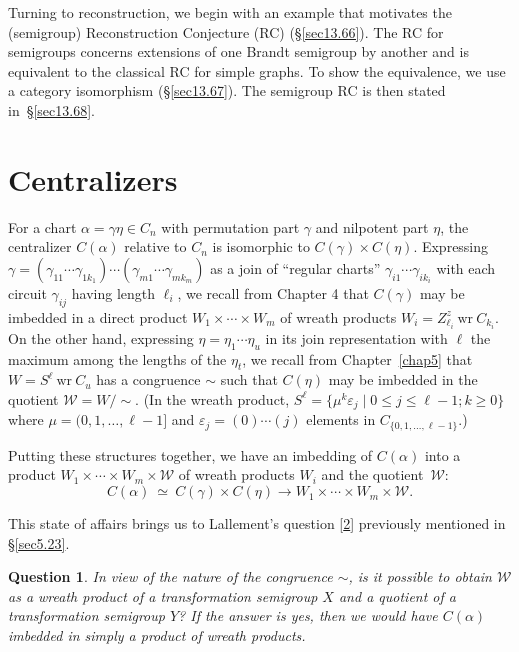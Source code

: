 \documentclass{surv-l}
\numberwithin{equation}{section}
\numberwithin{table}{section}
\numberwithin{figure}{section}
\newtheorem{question}[equation]{Question}
\theoremstyle{definition}
\begin{document}
Turning to reconstruction, we begin with an example that motivates
the (semigroup) Reconstruction Conjecture (RC) (\S\ref{sec13.66}).
The RC for semigroups concerns extensions of one Brandt semigroup
by another and is equivalent to the classical RC for simple
graphs. To show the equivalence, we use a category isomorphism
(\S\ref{sec13.67}). The semigroup RC is then stated
in~\S\ref{sec13.68}.

\setcounter{section}{61}
\section{Centralizers}\label{sec13.62}

For a chart $\alpha=\gamma\eta\in C_{n}$ with permutation part
$\gamma$ and nilpotent part $\eta$, the centralizer $C(\alpha)$
relative to $C_{n}$ is isomorphic to $C(\gamma)\times C(\eta)$.
Expressing
$\gamma=(\gamma_{11}\cdots\gamma_{1k_{1}})\cdots(\gamma_{m1}\cdots\gamma_{mk_{m}})$
as a join of ``regular charts'' $\gamma_{i1}\cdots\gamma_{ik_{i}}$
with each circuit $\gamma_{ij}$ having length $\ell_{i}$, we
recall from Chapter 4 that $C(\gamma)$ may be imbedded in a direct
product $W_{1}\times\cdots\times W_{m}$ of wreath products
$W_{i}=Z_{\ell_{i}}^{z}\ \mathrm{wr}\ C_{k_{i}}$. On the other
hand, expressing $\eta=\eta_{1}\cdots\eta_{u}$ in its join
representation with $\ell$ the maximum among the lengths of the
$\eta_{t}$, we recall from Chapter~\ref{chap5} that $W=S^{\ell}\
\mathrm{wr}\ C_{u}$ has a congruence $\sim$ such that $C(\eta)$
may be imbedded in the quotient $\mathcal{W}=W/\sim$. (In the
wreath product, $S^{\ell}= \{\mu^{k}\varepsilon_{j}\mid 0\leq
j\leq\ell-1;k\geq 0\}$ where $\mu=(0,1,\ldots, \ell-1]$ and
$\varepsilon_{j}=(0)\cdots(j)$ elements in
$C_{\{0,1,\ldots,\ell-1\}}.$)

Putting these structures together, we have an imbedding of
$C(\alpha)$ into a product $W_{1}\times\cdots\times
W_{m}\times \mathcal{W}$ of wreath products $W_{i}$ and the
quotient~$\mathcal{W}$:
\[
C(\alpha)\ \simeq\  C(\gamma)\times C(\eta)\longrightarrow
W_{1}\times\cdots\times W_{m}\times \mathcal{W}.
\]

This state of affairs brings us to Lallement's
question
[\hyperlink{bib38a}{2}] previously mentioned in
\S\ref{sec5.23}.

\begin{question}\label{ques13.62.1}
In view of the nature of the congruence $\sim$, is it possible
to obtain $\mathcal{W}$ as a wreath product of a
transformation semigroup $X$ and a quotient of a
transformation semigroup $Y$? If the answer is yes, then we
would have $C(\alpha)$ imbedded in simply a product of wreath
products.
\end{question}
\end{document}

